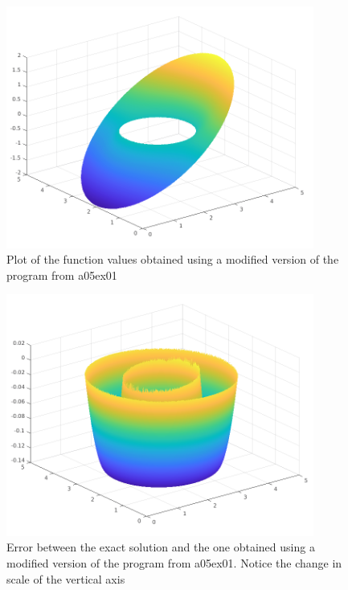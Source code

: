 \begin{figure}[H]
	\centering
	\includegraphics[width=0.9\textwidth]{Documentation/Figures/a06ex02d_uh.png} 
	\caption{Plot of the function values obtained using a modified version of the program from a05ex01}
	\label{fig:a05ex02b}
\end{figure}

\begin{figure}[H]
	\centering
	\includegraphics[width=0.9\textwidth]{Documentation/Figures/a06ex02d_error.png} 
	\caption{Error between the exact solution and the one obtained using a modified version of the program from a05ex01. Notice the change in scale of the vertical axis}
	\label{fig:a05ex02b}
\end{figure}
